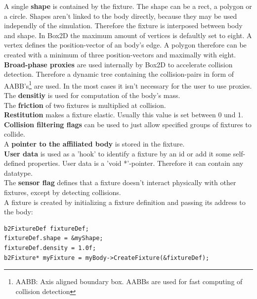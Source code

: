 \documentclass[10pt,a4paper,DIV=11]{scrreprt}
\begin{document}
A single \textbf{shape} is contained by the fixture. The shape can be a rect, a polygon or a circle. Shapes aren't linked to the body directly, because they may be used independly of the simulation. Therefore the fixture is interposed between body and shape. In Box2D the maximum amount of vertices is defaultly set to eight. A vertex defines the position-vector of an body's edge. A polygon therefore can be created with a minimum of three position-vectors and maximally with eight.
\\

\textbf{Broad-phase proxies} are used internally by Box2D to accelerate collision detection. Therefore a dynamic tree containing the collision-pairs in form of AABB's\footnote{AABB: Axis aligned boundary box. AABBs are used for fast computing of collision detection} are used. In the most cases it isn't necessary for the user to use proxies. \\

The \textbf{densitiy} is used for computation of the body's mass.\\

The \textbf{friction} of two fixtures is multiplied at collision. \\

\textbf{Restitution} makes a fixture elastic. Usually this value is set between 0 und 1. \\

\textbf{Collision filtering flags} can be used to just allow specified groups of fixtures to collide. \\

A \textbf{pointer to the affiliated body} is stored in the fixture.\\

\textbf{User data} is used as a 'hook' to identify a fixture by an id or add it some self-defined properties. User data is a 'void *'-pointer. Therefore it can contain any datatype. \\

The \textbf{sensor flag} defines that a fixture doesn't interact physically with other fixtures, except by detecting collisions. \\



A fixture is created by initializing a fixture definition and passing its address to the body:

\begin{lstlisting}[caption={Creation of a fixture (source Box2D manual)},label=lst:fixture-create]
b2FixtureDef fixtureDef;
fixtureDef.shape = &myShape;
fixtureDef.density = 1.0f;
b2Fixture* myFixture = myBody->CreateFixture(&fixtureDef);
\end{lstlisting}
\end{document}
